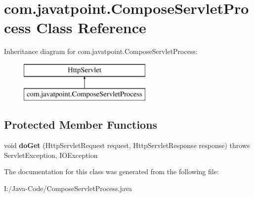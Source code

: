 \hypertarget{classcom_1_1javatpoint_1_1_compose_servlet_process}{}\section{com.\+javatpoint.\+Compose\+Servlet\+Process Class Reference}
\label{classcom_1_1javatpoint_1_1_compose_servlet_process}
Inheritance diagram for com.\+javatpoint.\+Compose\+Servlet\+Process\+:\begin{figure}[H]
\begin{center}
\leavevmode
\includegraphics[height=2.000000cm]{classcom_1_1javatpoint_1_1_compose_servlet_process}
\end{center}
\end{figure}
\subsection*{Protected Member Functions}
\begin{DoxyCompactItemize}
\item 
\mbox{\label{classcom_1_1javatpoint_1_1_compose_servlet_process_ad4d443587af09e51c4b5e970a3fbe978}} 
void {\bfseries do\+Get} (Http\+Servlet\+Request request, Http\+Servlet\+Response response)  throws Servlet\+Exception, I\+O\+Exception 
\end{DoxyCompactItemize}


The documentation for this class was generated from the following file\+:\begin{DoxyCompactItemize}
\item 
I\+:/\+Java-\/\+Code/Compose\+Servlet\+Process.\+java\end{DoxyCompactItemize}
